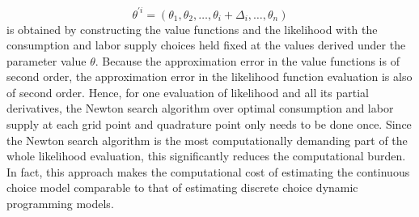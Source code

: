 \documentclass{article}
\begin{document}
$$\theta^{'i} = (\theta_1,\theta_2, \dots, \theta_i + \Delta_i, \dots, \theta_n)$$
is obtained by constructing the value functions and the likelihood with the consumption and labor supply choices held fixed at the values derived under the parameter value $\theta$. Because the approximation error in the value functions is of second order, the approximation error in the likelihood function evaluation is also of second order. Hence, for one evaluation of likelihood and all its partial derivatives, the Newton search algorithm over optimal consumption and labor supply at each grid point and quadrature point only needs to be done once. Since the Newton search algorithm is the most computationally demanding part of the whole likelihood evaluation, this significantly reduces the computational burden. In fact, this approach makes the computational cost of estimating the continuous choice model comparable to that of estimating discrete choice dynamic programming models.
\end{document}
